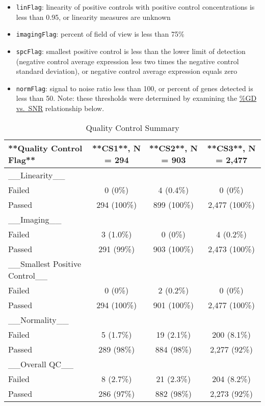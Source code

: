 \documentclass[
]{report}
\providecommand{\tightlist}{%
  \setlength{\itemsep}{0pt}\setlength{\parskip}{0pt}}
\begin{document}
\begin{itemize}
\tightlist
\item
  \texttt{linFlag}: linearity of positive controls with positive control concentrations is less than 0.95, or linearity measures are unknown
\item
  \texttt{imagingFlag}: percent of field of view is less than 75\%
\item
  \texttt{spcFlag}: smallest positive control is less than the lower limit of detection (negative control average expression less two times the negative control standard deviation), or negative control average expression equals zero
\item
  \texttt{normFlag}: signal to noise ratio less than 100, or percent of genes detected is less than 50. Note: these thresholds were determined by examining the \hyperref[gd-vs.-snr]{\%GD vs.~SNR} relationship below.
\end{itemize}

\begin{table}

\caption{\label{tab:qc-failed}Quality Control Summary}
\centering
\begin{tabular}[t]{l|c|c|c}
\hline
**Quality Control Flag** & **CS1**, N = 294 & **CS2**, N = 903 & **CS3**, N = 2,477\\
\hline
\_\_Linearity\_\_ &  &  & \\
\hline
Failed & 0 (0\%) & 4 (0.4\%) & 0 (0\%)\\
\hline
Passed & 294 (100\%) & 899 (100\%) & 2,477 (100\%)\\
\hline
\_\_Imaging\_\_ &  &  & \\
\hline
Failed & 3 (1.0\%) & 0 (0\%) & 4 (0.2\%)\\
\hline
Passed & 291 (99\%) & 903 (100\%) & 2,473 (100\%)\\
\hline
\_\_Smallest Positive Control\_\_ &  &  & \\
\hline
Failed & 0 (0\%) & 2 (0.2\%) & 0 (0\%)\\
\hline
Passed & 294 (100\%) & 901 (100\%) & 2,477 (100\%)\\
\hline
\_\_Normality\_\_ &  &  & \\
\hline
Failed & 5 (1.7\%) & 19 (2.1\%) & 200 (8.1\%)\\
\hline
Passed & 289 (98\%) & 884 (98\%) & 2,277 (92\%)\\
\hline
\_\_Overall QC\_\_ &  &  & \\
\hline
Failed & 8 (2.7\%) & 21 (2.3\%) & 204 (8.2\%)\\
\hline
Passed & 286 (97\%) & 882 (98\%) & 2,273 (92\%)\\
\hline
\end{tabular}
\end{table}
\end{document}
